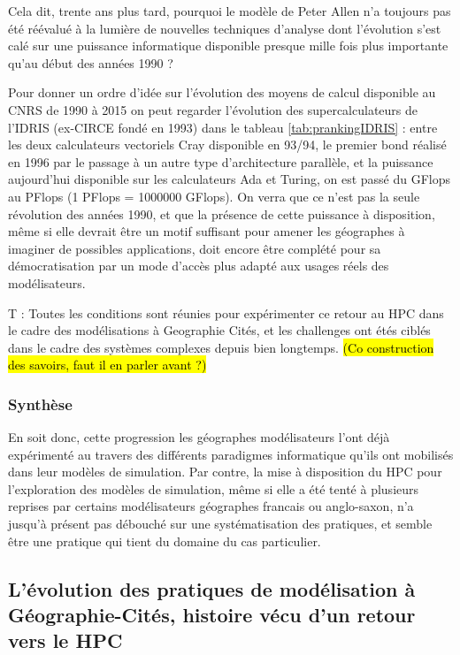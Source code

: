 Cela dit, trente ans plus tard, pourquoi le modèle de Peter Allen n'a toujours pas été réévalué à la lumière de nouvelles techniques d'analyse dont l'évolution s'est calé sur une puissance informatique disponible presque mille fois plus importante qu'au début des années 1990 ?

Pour donner un ordre d'idée sur l'évolution des moyens de calcul disponible au CNRS de 1990 à 2015 on peut regarder l'évolution des supercalculateurs de l'IDRIS (ex-CIRCE fondé en 1993) dans le tableau \ref{tab:prankingIDRIS} : entre les deux calculateurs vectoriels Cray disponible en 93/94, le premier bond réalisé en 1996 par le passage à un autre type d'architecture parallèle, et la puissance aujourd'hui disponible sur les calculateurs Ada et Turing, on est passé du GFlops au PFlops (1 PFlops = 1000000 GFlops). On verra que ce n'est pas la seule révolution des années 1990, et que la présence de cette puissance à disposition, même si elle devrait être un motif suffisant pour amener les géographes à imaginer de possibles applications, doit encore être complété pour sa démocratisation par un mode d'accès plus adapté aux usages réels des modélisateurs.



T : Toutes les conditions sont réunies pour expérimenter ce retour au HPC dans le cadre des modélisations à Geographie Cités, et les challenges ont étés ciblés dans le cadre des systèmes complexes depuis bien longtemps. \hl{(Co construction des savoirs, faut il en parler avant ?)}

\subsubsection{Synthèse}
\label{sssec:synthese}

En soit donc, cette progression les géographes modélisateurs l'ont déjà expérimenté au travers des différents paradigmes informatique qu'ils ont mobilisés dans leur modèles de simulation. Par contre, la mise à disposition du HPC pour l'exploration des modèles de simulation, même si elle a été tenté à plusieurs reprises par certains modélisateurs géographes francais ou anglo-saxon, n'a jusqu'à présent pas débouché sur une systématisation des pratiques, et semble être une pratique qui tient du domaine du cas particulier.

\subsection{L'évolution des pratiques de modélisation à Géographie-Cités, histoire vécu d'un retour vers le HPC}
\label{ssec:hist_pratiques}

